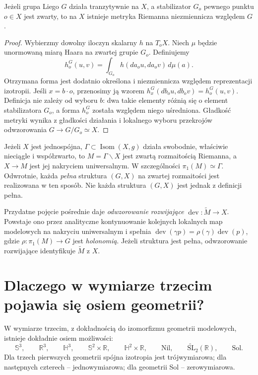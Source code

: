 \begin{twierdzenie}
\label{thm:metryka-niezmiennicza}
Jeżeli grupa Liego $G$ działa tranzytywnie na $X$, a stabilizator $G_o$
pewnego punktu $o\in X$ jest zwarty, to na $X$ istnieje metryka
Riemanna niezmiennicza względem $G$.
\end{twierdzenie}
\begin{proof}
Wybierzmy dowolny iloczyn skalarny $h$ na $T_oX$. Niech $\mu$ będzie
unormowaną miarą Haara na zwartej grupie $G_o$. Definiujemy
\[
 h_o^{G}(u,v)=\int_{G_o}h(da_o u,da_o v)\,d\mu(a).
\]
Otrzymana forma jest dodatnio określona i niezmiennicza względem
reprezentacji izotropii. Jeśli $x=b\cdot o$, przenosimy ją wzorem
$h_x^G(db_o u,db_o v)=h_o^G(u,v)$. Definicja nie zależy od wyboru $b$:
dwa takie elementy różnią się o element stabilizatora $G_o$, a forma
$h_o^G$ została względem niego uśredniona. Gładkość metryki wynika z
gładkości działania i lokalnego wyboru przekrojów odwzorowania
$G\to G/G_o\simeq X$.
\end{proof}

\begin{uwaga}
Jeżeli $X$ jest jednospójna, $\Gamma\subset\operatorname{Isom}(X,g)$
działa swobodnie, właściwie nieciągle i współzwarto, to
$M=\Gamma\backslash X$ jest zwartą rozmaitością Riemanna, a
$X\to M$ jest jej nakryciem uniwersalnym. W szczególności
$\pi_1(M)\simeq\Gamma$. Odwrotnie, każda \emph{pełna} struktura
$(G,X)$ na zwartej rozmaitości jest realizowana w ten sposób.
Nie każda struktura $(G,X)$ jest jednak z definicji pełna.
\end{uwaga}

Przydatne pojęcie pośrednie daje \emph{odwzorowanie rozwijające}
$\operatorname{dev}\colon\widetilde M\to X$. Powstaje ono przez analityczne
kontynuowanie kolejnych lokalnych map modelowych na nakryciu
uniwersalnym i spełnia
$\operatorname{dev}(\gamma p)=\rho(\gamma)\operatorname{dev}(p)$,
gdzie $\rho\colon\pi_1(M)\to G$ jest \emph{holonomią}. Jeżeli struktura
jest pełna, odwzorowanie rozwijające identyfikuje $\widetilde M$ z $X$.

\section{Dlaczego w wymiarze trzecim pojawia się osiem geometrii?}

\begin{twierdzenie}
\label{thm:osiem-geometrii}
W wymiarze trzecim, z dokładnością do izomorfizmu geometrii modelowych,
istnieje dokładnie osiem możliwości:
\[
\mathbb S^3,\qquad \mathbb R^3,\qquad \mathbb H^3,\qquad
\mathbb S^2\!\times\!\mathbb R,\qquad
\mathbb H^2\!\times\!\mathbb R,\qquad
\mathrm{Nil},\qquad\widetilde{\mathrm{SL}}_2(\mathbb R),\qquad
\mathrm{Sol}.
\]
Dla trzech pierwszych geometrii spójna izotropia jest trójwymiarowa;
dla następnych czterech -- jednowymiarowa; dla geometrii Sol --
zerowymiarowa.
\end{twierdzenie}


